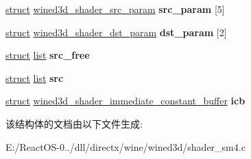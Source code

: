 \begin{DoxyCompactItemize}
\begin{tabbing}
\end{tabbing}\item 
\mbox{\label{structwined3d__sm4__data_a8ff086c5392a060b7ec657aa6ba526b8}} 
\hyperlink{interfacestruct}{struct} \hyperlink{structwined3d__shader__src__param}{wined3d\+\_\+shader\+\_\+src\+\_\+param} {\bfseries src\+\_\+param} \mbox{[}5\mbox{]}
\item 
\mbox{\label{structwined3d__sm4__data_a4849b25a18067da02620e954acb2ba7b}} 
\hyperlink{interfacestruct}{struct} \hyperlink{structwined3d__shader__dst__param}{wined3d\+\_\+shader\+\_\+dst\+\_\+param} {\bfseries dst\+\_\+param} \mbox{[}2\mbox{]}
\item 
\mbox{\label{structwined3d__sm4__data_a3fba493cdba79c9b73e0c1a5b4797328}} 
\hyperlink{interfacestruct}{struct} \hyperlink{classlist}{list} {\bfseries src\+\_\+free}
\item 
\mbox{\label{structwined3d__sm4__data_ae3595bb15cd9166acfb01b1900cc12da}} 
\hyperlink{interfacestruct}{struct} \hyperlink{classlist}{list} {\bfseries src}
\item 
\mbox{\label{structwined3d__sm4__data_a41d91e2cb2365b463ab2cdb257573695}} 
\hyperlink{interfacestruct}{struct} \hyperlink{structwined3d__shader__immediate__constant__buffer}{wined3d\+\_\+shader\+\_\+immediate\+\_\+constant\+\_\+buffer} {\bfseries icb}
\end{DoxyCompactItemize}


该结构体的文档由以下文件生成\+:\begin{DoxyCompactItemize}
\item 
E\+:/\+React\+O\+S-\/0../dll/directx/wine/wined3d/shader\+\_\+sm4.\+c\end{DoxyCompactItemize}

